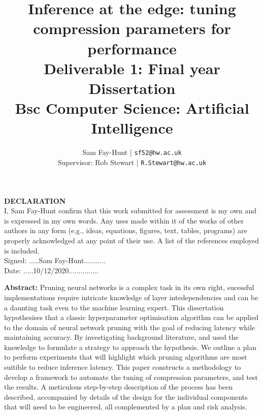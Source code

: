 \documentclass[11pt]{article}
\begin{document}
\title{%
	\bf Inference at the edge: tuning compression parameters for performance\\ 
	\large Deliverable 1: Final year Dissertation \\
	Bsc Computer Science: Artificial Intelligence}

\author{
	Sam Fay-Hunt | \texttt{sf52@hw.ac.uk}\\
	Supervisor: Rob Stewart | \texttt{R.Stewart@hw.ac.uk}
}

\maketitle
\thispagestyle{empty}
\pagebreak

\textbf{DECLARATION}\\
I, Sam Fay-Hunt confirm that this work submitted for assessment is my own and is expressed in
my own words. Any uses made within it of the works of other authors in any form (e.g., ideas,
equations, figures, text, tables, programs) are properly acknowledged at any point of their
use. A list of the references employed is included.\\
Signed: .....Sam Fay-Hunt...........\\
Date: .....10/12/2020...............
\thispagestyle{empty}
\pagebreak

\textbf{Abstract:} 
Pruning neural networks is a complex task in its own right, sucessful implementations require intricate knowledge of layer intedependencies and can be a daunting task even to the machine learning expert. 
This dissertation hypothesises that a classic hyperparameter optimisation algorithm can be applied to the domain of neural network pruning with the goal of reducing latency while maintaining accuracy. 
By investigating background literature, and used the knowledge to formulate a strategy to approach the hypothesis.
We outline a plan to perform experiments that will highlight which pruning algorithms are most suitible to reduce inference latency.
This paper constructs a methodology to develop a framework to automate the tuning of compression parameters, and test the results. 
A meticulous step-by-step description of the process has been described, accompanied by details of the design for the individual components that will need to be engineered, all complemented by a plan and risk analysis.



\thispagestyle{empty}
\pagebreak

\tableofcontents
\thispagestyle{empty}
\pagebreak
\end{document}
